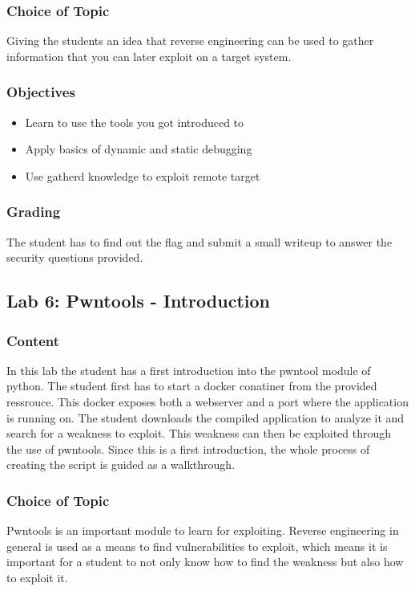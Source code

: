 \subsubsection*{Choice of Topic}
Giving the students an idea that reverse engineering can be used to gather information that you can later exploit on a target system.
\subsubsection*{Objectives}
\begin{itemize}
    \item Learn to use the tools you got introduced to
    \item Apply basics of dynamic and static debugging
    \item Use gatherd knowledge to exploit remote target
\end{itemize}
\subsubsection*{Grading}
The student has to find out the flag and submit a small writeup to answer the security questions provided.


\subsection{Lab 6: Pwntools - Introduction}
\subsubsection*{Content}
In this lab the student has a first introduction into the pwntool module of python. The student first has to start a docker conatiner from the provided ressrouce. This docker exposes both a webserver and a port where the application is running on. The student downloads the compiled application to analyze it and search for a weakness to exploit. This weakness can then be exploited through the use of pwntools. Since this is a first introduction, the whole process of creating the script is guided as a walkthrough.
\subsubsection*{Choice of Topic}
Pwntools is an important module to learn for exploiting. Reverse engineering in general is used as a means to find vulnerabilities to exploit, which means it is important for a student to not only know how to find the weakness but also how to exploit it.
